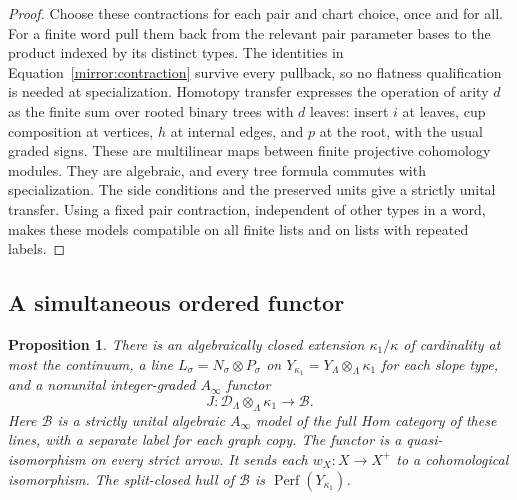 \documentclass[11pt]{article}
\newtheorem{proposition}[theorem]{Proposition}
\theoremstyle{definition}
\theoremstyle{remark}
\numberwithin{equation}{section}
\begin{document}
\begin{proof}
Choose these contractions for each pair and chart choice, once and
for all.  For a finite word pull them back from the relevant pair
parameter bases to the product indexed by its distinct types.
The identities in Equation~\eqref{mirror:contraction} survive every
pullback, so no flatness qualification is needed at specialization.
Homotopy transfer expresses the operation of arity $d$ as the finite
sum over rooted binary trees with $d$ leaves: insert $i$ at leaves,
cup composition at vertices, $h$ at internal edges, and $p$ at the
root, with the usual graded signs.  These are multilinear maps
between finite projective cohomology modules.  They are algebraic,
and every tree formula commutes with specialization.  The side
conditions and the preserved units give a strictly unital transfer.
Using a fixed pair contraction, independent of other types in a
word, makes these models compatible on all finite lists and on
lists with repeated labels.
\end{proof}

\subsection{A simultaneous ordered functor}

\begin{proposition}
\label{mirror:simultaneous}
There is an algebraically closed extension $\kappa_1/\kappa$ of
cardinality at most the continuum, a line
$L_\sigma=N_\sigma\otimes P_\sigma$ on
$Y_{\kappa_1}=Y_\Lambda\otimes_\Lambda\kappa_1$ for each slope
type, and a nonunital integer-graded $A_\infty$ functor
\begin{equation}
 J:\mathcal D_\Lambda\otimes_\Lambda\kappa_1
             \longrightarrow\mathcal B.
 \label{mirror:simultaneous-functor}
\end{equation}
Here $\mathcal B$ is a strictly unital algebraic $A_\infty$ model of
the full Hom category of these lines, with a separate label for
each graph copy.  The functor is a quasi-isomorphism on every strict
arrow.  It sends each $w_X:X\to X^+$ to a cohomological
isomorphism.  The split-closed hull of $\mathcal B$ is
$\operatorname{Perf}(Y_{\kappa_1})$.
\end{proposition}
\end{document}
